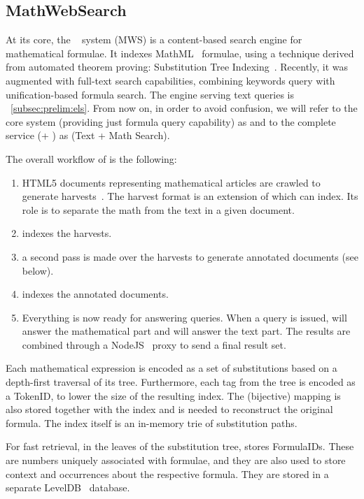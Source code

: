 \subsection{MathWebSearch}\label{subsec:prelim:mws}

At its core, the \mws~\cite{ProKoh:mwsofse11} system (MWS) is a content-based
search engine for mathematical formulae. It indexes MathML~\cite{mathml:online}
formulae, using a technique derived from automated theorem proving:
Substitution Tree Indexing~\cite{Graf94}. Recently, it was augmented with
full-text search capabilities, combining keywords query with unification-based
formula search. The engine serving text queries is
\els~\ref{subsec:prelim:els}.  From now on, in order to avoid confusion, we
will refer to the core system (providing just formula query capability) as \MWS
and to the complete service (\MWS + \els) as \tms (Text + Math Search).

The overall workflow of \tms is the following:
\begin{enumerate}
    \item HTML5 documents representing mathematical articles are
        crawled to generate \MWS harvests~\cite{mwsharvest:online}.
        The \textsf{harvest} format is an extension of \mathml which \MWS can
        index. Its role is to separate the math from the text in a given
        document.
    \item \MWS indexes the harvests.
    \item a second pass is made over the harvests to generate annotated
        documents (see below).
    \item \els indexes the annotated documents.
    \item Everything is now ready for answering queries. When a query is
        issued, \MWS will answer the mathematical part and \els will answer the
        text part.  The results are combined through a
        NodeJS~\cite{nodejs:online} proxy to send a final result set.
\end{enumerate}

Each mathematical expression is encoded as a set of substitutions based
on a depth-first traversal of its \cmml tree.
Furthermore, each tag from the \cmml tree is encoded as a \textsf{TokenID},
to lower the size of the resulting index. The (bijective) mapping is also
stored together with the index and is needed to reconstruct the original
formula. The index itself is an in-memory trie of substitution paths.

For fast retrieval, in the leaves of the substitution tree, \MWS stores
\textsf{FormulaID}s. These are numbers uniquely associated with formulae,
and they are also used to store context and occurrences about the respective
formula. They are stored in a separate LevelDB~\cite{leveldb:online} database.

